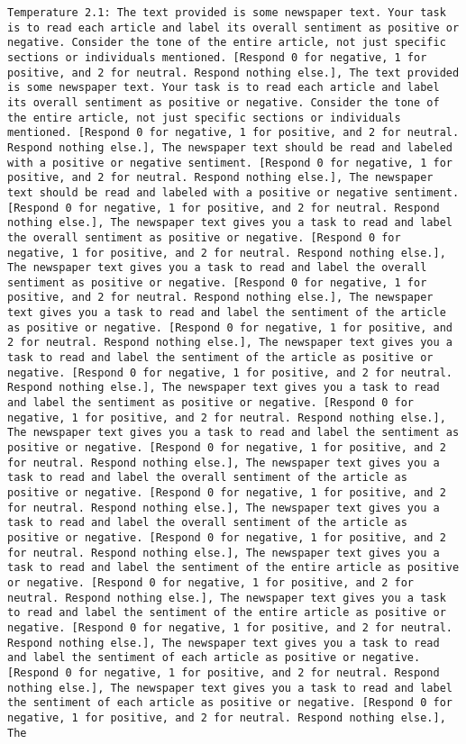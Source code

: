 \begin{lstlisting}[label=lst:poor_performing_prompts]
	Temperature 2.1: The text provided is some newspaper text. Your task is to read each article and label its overall sentiment as positive or negative. Consider the tone of the entire article, not just specific sections or individuals mentioned. [Respond 0 for negative, 1 for positive, and 2 for neutral. Respond nothing else.], The text provided is some newspaper text. Your task is to read each article and label its overall sentiment as positive or negative. Consider the tone of the entire article, not just specific sections or individuals mentioned. [Respond 0 for negative, 1 for positive, and 2 for neutral. Respond nothing else.], The newspaper text should be read and labeled with a positive or negative sentiment. [Respond 0 for negative, 1 for positive, and 2 for neutral. Respond nothing else.], The newspaper text should be read and labeled with a positive or negative sentiment. [Respond 0 for negative, 1 for positive, and 2 for neutral. Respond nothing else.], The newspaper text gives you a task to read and label the overall sentiment as positive or negative. [Respond 0 for negative, 1 for positive, and 2 for neutral. Respond nothing else.], The newspaper text gives you a task to read and label the overall sentiment as positive or negative. [Respond 0 for negative, 1 for positive, and 2 for neutral. Respond nothing else.], The newspaper text gives you a task to read and label the sentiment of the article as positive or negative. [Respond 0 for negative, 1 for positive, and 2 for neutral. Respond nothing else.], The newspaper text gives you a task to read and label the sentiment of the article as positive or negative. [Respond 0 for negative, 1 for positive, and 2 for neutral. Respond nothing else.], The newspaper text gives you a task to read and label the sentiment as positive or negative. [Respond 0 for negative, 1 for positive, and 2 for neutral. Respond nothing else.], The newspaper text gives you a task to read and label the sentiment as positive or negative. [Respond 0 for negative, 1 for positive, and 2 for neutral. Respond nothing else.], The newspaper text gives you a task to read and label the overall sentiment of the article as positive or negative. [Respond 0 for negative, 1 for positive, and 2 for neutral. Respond nothing else.], The newspaper text gives you a task to read and label the overall sentiment of the article as positive or negative. [Respond 0 for negative, 1 for positive, and 2 for neutral. Respond nothing else.], The newspaper text gives you a task to read and label the sentiment of the entire article as positive or negative. [Respond 0 for negative, 1 for positive, and 2 for neutral. Respond nothing else.], The newspaper text gives you a task to read and label the sentiment of the entire article as positive or negative. [Respond 0 for negative, 1 for positive, and 2 for neutral. Respond nothing else.], The newspaper text gives you a task to read and label the sentiment of each article as positive or negative. [Respond 0 for negative, 1 for positive, and 2 for neutral. Respond nothing else.], The newspaper text gives you a task to read and label the sentiment of each article as positive or negative. [Respond 0 for negative, 1 for positive, and 2 for neutral. Respond nothing else.], The 
\end{lstlisting}
